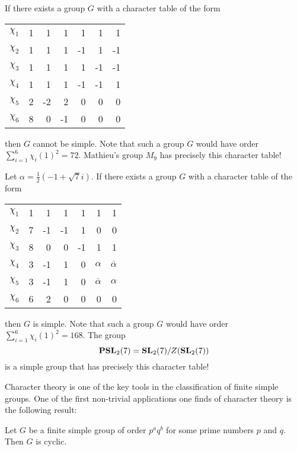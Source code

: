 \begin{example}
    If there exists a group $G$ with
    a character table 
    of the form
    \begin{center}
		\begin{tabular}{|c|rrrrrr|}
			\hline
			$\chi_{1}$ & 1 & 1 & 1 & 1 & 1 & 1\tabularnewline
			$\chi_{2}$ & 1 & 1 & 1 & -1 & 1 & -1 \tabularnewline
			$\chi_{3}$ & 1 & 1 & 1 & 1 & -1 & -1\tabularnewline
		    $\chi_{4}$ & 1 & 1 & 1 & -1 & -1 & 1\tabularnewline
			$\chi_{5}$ & 2 & -2 & 2 & 0 & 0 & 0\tabularnewline
			$\chi_{6}$ & 8 & 0 & -1 & 0 & 0 & 0\tabularnewline
			\hline
		\end{tabular}
	\end{center}
	then $G$ cannot be simple. Note that such a group $G$ would have order $\sum_{i=1}^6\chi_i(1)^2=72$. 
	Mathieu's group $M_{9}$ has precisely this character table! 
\end{example}

\begin{example}
    Let $\alpha=\frac{1}{2}(-1+\sqrt{7}i)$. 
    If there exists a group $G$ with a character table
    of the form
    \begin{center}
		\begin{tabular}{|c|rrrrrr|}
			\hline
			$\chi_{1}$ & 1 & 1 & 1 & 1 & 1 & 1\tabularnewline
			$\chi_{2}$ & 7 & -1 & -1 & 1 & 0 & 0 \tabularnewline
			$\chi_{3}$ & 8 & 0 & 0 & -1 & 1 & 1\tabularnewline
		    $\chi_{4}$ & 3 & -1 & 1 & 0 & $\alpha$ & $\overline{\alpha}$ \tabularnewline
			$\chi_{5}$ & 3 & -1 & 1 & 0 & $\overline{\alpha}$ & $\alpha$\tabularnewline
			$\chi_{6}$ & 6 & 2 & 0 & 0 & 0 & 0\tabularnewline
			\hline
		\end{tabular}
	\end{center}    
	then $G$ is simple. Note that such a group $G$ would have order 
	$\sum_{i=1}^6\chi_i(1)^2=168$. 
	The group  
	\[
	\mathbf{PSL}_2(7)=\mathbf{SL}_2(7)/Z(\mathbf{SL}_2(7))
	\]
	is a simple group that has precisely this character table!  
\end{example}


Character theory is one of the key tools in the 
classification of finite simple groups. 
One of the first non-trivial applications
one finds of character theory is 
the following result:

\begin{theorem}[Burnside]
    Let $G$ be a finite simple group of order $p^aq^b$ for some
    prime numbers $p$ and $q$. Then $G$ is cyclic. 
\end{theorem}

